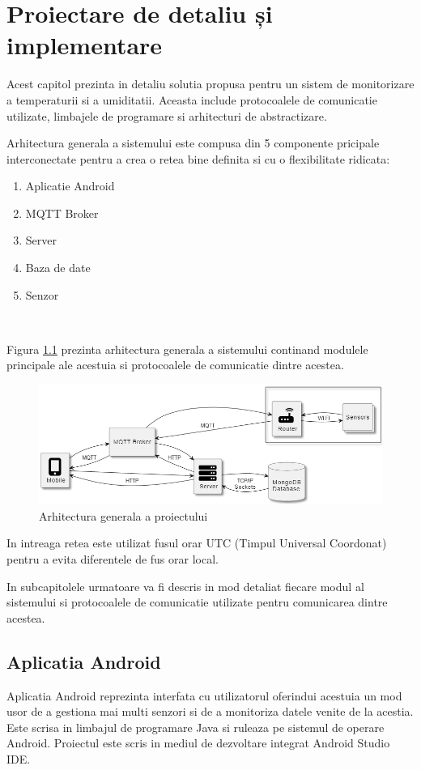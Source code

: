 \chapter{Proiectare de detaliu și implementare}
\pagestyle{fancy}

Acest capitol prezinta in detaliu solutia propusa pentru un sistem de monitorizare a temperaturii si a umiditatii. Aceasta include protocoalele de 
comunicatie utilizate, limbajele de programare si arhitecturi de abstractizare.

Arhitectura generala a sistemului este compusa din 5 componente pricipale interconectate pentru a crea o retea bine definita si cu o flexibilitate
ridicata:
\begin{enumerate}
	\item Aplicatie Android
	\item MQTT Broker
	\item Server
	\item Baza de date
	\item Senzor
\end{enumerate}

\

Figura \ref{fig:ArhitecturaGenerala} prezinta arhitectura generala a sistemului continand modulele principale ale acestuia si protocoalele de comunicatie 
dintre acestea.
\begin{figure}[H]
    \centering
    \includegraphics[scale=0.72]{figs/ArhitecturaGenerala.png}
    \caption{Arhitectura generala a proiectului}
    \label{fig:ArhitecturaGenerala}
\end{figure}

In intreaga retea este utilizat fusul orar UTC (Timpul Universal Coordonat) pentru a evita diferentele de fus orar local.

In subcapitolele urmatoare va fi descris in mod detaliat fiecare modul al sistemului si protocoalele de comunicatie utilizate pentru comunicarea dintre 
acestea.

\section{Aplicatia Android}\label{sec:pi_appandroid}
Aplicatia Android reprezinta interfata cu utilizatorul oferindui acestuia un mod usor de a gestiona mai multi senzori si de a monitoriza datele venite de la
acestia. Este scrisa in limbajul de programare Java si ruleaza pe sistemul de operare Android. Proiectul este scris in mediul de dezvoltare integrat Android 
Studio IDE.

